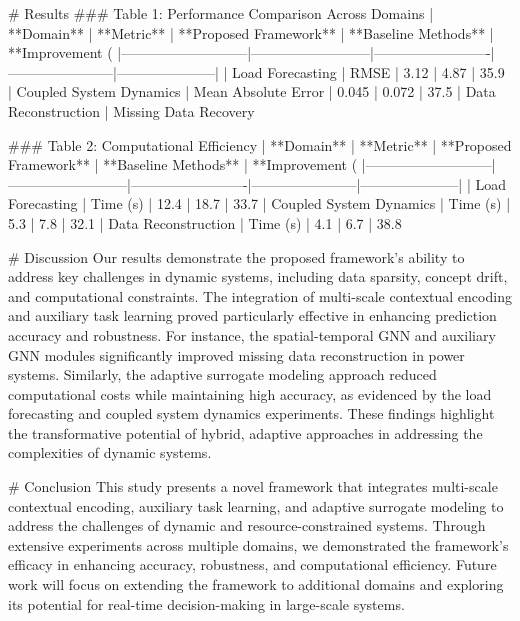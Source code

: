 # Results  
### Table 1: Performance Comparison Across Domains  
| **Domain**                | **Metric**               | **Proposed Framework** | **Baseline Methods**  | **Improvement (%
|---------------------------|--------------------------|-------------------------|-----------------------|---------------------|  
| Load Forecasting          | RMSE                    | 3.12                   | 4.87                  | 35.9%
| Coupled System Dynamics   | Mean Absolute Error     | 0.045                  | 0.072                 | 37.5%
| Data Reconstruction       | Missing Data Recovery %

### Table 2: Computational Efficiency  
| **Domain**                | **Metric**               | **Proposed Framework** | **Baseline Methods**  | **Improvement (%
|---------------------------|--------------------------|-------------------------|-----------------------|---------------------|  
| Load Forecasting          | Time (s)                | 12.4                   | 18.7                  | 33.7%
| Coupled System Dynamics   | Time (s)                | 5.3                    | 7.8                   | 32.1%
| Data Reconstruction       | Time (s)                | 4.1                    | 6.7                   | 38.8%

# Discussion  
Our results demonstrate the proposed framework's ability to address key challenges in dynamic systems, including data sparsity, concept drift, and computational constraints. The integration of multi-scale contextual encoding and auxiliary task learning proved particularly effective in enhancing prediction accuracy and robustness. For instance, the spatial-temporal GNN and auxiliary GNN modules significantly improved missing data reconstruction in power systems. Similarly, the adaptive surrogate modeling approach reduced computational costs while maintaining high accuracy, as evidenced by the load forecasting and coupled system dynamics experiments. These findings highlight the transformative potential of hybrid, adaptive approaches in addressing the complexities of dynamic systems.

# Conclusion  
This study presents a novel framework that integrates multi-scale contextual encoding, auxiliary task learning, and adaptive surrogate modeling to address the challenges of dynamic and resource-constrained systems. Through extensive experiments across multiple domains, we demonstrated the framework's efficacy in enhancing accuracy, robustness, and computational efficiency. Future work will focus on extending the framework to additional domains and exploring its potential for real-time decision-making in large-scale systems.

